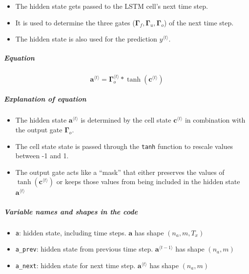 \documentclass[11pt]{article}
\providecommand{\tightlist}{%
      \setlength{\itemsep}{0pt}\setlength{\parskip}{0pt}}
\begin{document}
\begin{itemize}
\tightlist
\item
  The hidden state gets passed to the LSTM cell's next time step.
\item
  It is used to determine the three gates
  (\(\mathbf{\Gamma}_{f}, \mathbf{\Gamma}_{u}, \mathbf{\Gamma}_{o}\)) of
  the next time step.
\item
  The hidden state is also used for the prediction
  \(y^{\langle t \rangle}\).
\end{itemize}

\hypertarget{equation}{%
\subparagraph{Equation}\label{equation}}

\[ \mathbf{a}^{\langle t \rangle} = \mathbf{\Gamma}_o^{\langle t \rangle} * \tanh(\mathbf{c}^{\langle t \rangle})\tag{6} \]

\hypertarget{explanation-of-equation}{%
\subparagraph{Explanation of equation}\label{explanation-of-equation}}

\begin{itemize}
\tightlist
\item
  The hidden state \(\mathbf{a}^{\langle t \rangle}\) is determined by
  the cell state \(\mathbf{c}^{\langle t \rangle}\) in combination with
  the output gate \(\mathbf{\Gamma}_{o}\).
\item
  The cell state state is passed through the \texttt{tanh} function to
  rescale values between -1 and 1.
\item
  The output gate acts like a ``mask'' that either preserves the values
  of \(\tanh(\mathbf{c}^{\langle t \rangle})\) or keeps those values
  from being included in the hidden state
  \(\mathbf{a}^{\langle t \rangle}\)
\end{itemize}

\hypertarget{variable-names-and-shapes-in-the-code}{%
\subparagraph{Variable names and shapes in the
code}\label{variable-names-and-shapes-in-the-code}}

\begin{itemize}
\tightlist
\item
  \texttt{a}: hidden state, including time steps. \(\mathbf{a}\) has
  shape \((n_{a}, m, T_{x})\)
\item
  \texttt{a\_prev}: hidden state from previous time step.
  \(\mathbf{a}^{\langle t-1 \rangle}\) has shape \((n_{a}, m)\)
\item
  \texttt{a\_next}: hidden state for next time step.
  \(\mathbf{a}^{\langle t \rangle}\) has shape \((n_{a}, m)\)
\end{itemize}
\end{document}
